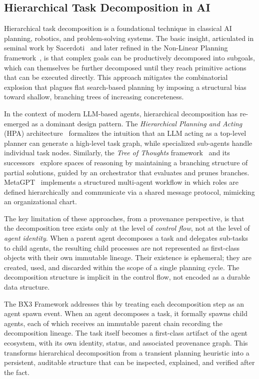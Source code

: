 \subsection{Hierarchical Task Decomposition in AI}

Hierarchical task decomposition is a foundational technique in classical AI planning, robotics, and problem-solving systems. The basic insight, articulated in seminal work by Sacerdoti~\cite{sacerdoti1977hierarchy} and later refined in the Non-Linear Planning framework~\cite{chapman1987planning}, is that complex goals can be productively decomposed into subgoals, which can themselves be further decomposed until they reach primitive actions that can be executed directly. This approach mitigates the combinatorial explosion that plagues flat search-based planning by imposing a structural bias toward shallow, branching trees of increasing concreteness.

In the context of modern LLM-based agents, hierarchical decomposition has re-emerged as a dominant design pattern. The \emph{Hierarchical Planning and Acting} (HPA) architecture~\cite{planchet2024hierarchical} formalizes the intuition that an LLM acting as a top-level planner can generate a high-level task graph, while specialized sub-agents handle individual task nodes. Similarly, the \emph{Tree of Thoughts} framework~\cite{yao2023tree} and its successors~\cite{braese2024process} explore spaces of reasoning by maintaining a branching structure of partial solutions, guided by an orchestrator that evaluates and prunes branches. MetaGPT~\cite{hong2023metagpt} implements a structured multi-agent workflow in which roles are defined hierarchically and communicate via a shared message protocol, mimicking an organizational chart.

The key limitation of these approaches, from a provenance perspective, is that the decomposition tree exists only at the level of \emph{control flow}, not at the level of \emph{agent identity}. When a parent agent decomposes a task and delegates sub-tasks to child agents, the resulting child processes are not represented as first-class objects with their own immutable lineage. Their existence is ephemeral; they are created, used, and discarded within the scope of a single planning cycle. The decomposition structure is implicit in the control flow, not encoded as a durable data structure.

The BX3 Framework addresses this by treating each decomposition step as an agent spawn event. When an agent decomposes a task, it formally spawns child agents, each of which receives an immutable parent chain recording the decomposition lineage. The task itself becomes a first-class artifact of the agent ecosystem, with its own identity, status, and associated provenance graph. This transforms hierarchical decomposition from a transient planning heuristic into a persistent, auditable structure that can be inspected, explained, and verified after the fact.

